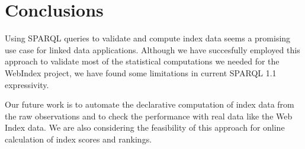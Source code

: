 \section{Conclusions}

Using SPARQL queries to validate and compute index data seems a promising use
case for linked data applications. 
Although we have succesfully employed this approach to validate most of the
statistical computations we needed for the WebIndex project, we have found some
limitations in current SPARQL 1.1 expressivity.

Our future work is to automate the declarative computation of index data
 from the raw observations and to check the performance with real data like
 the Web Index data. We are also considering the feasibility of this approach 
 for online calculation of index scores and rankings. 

